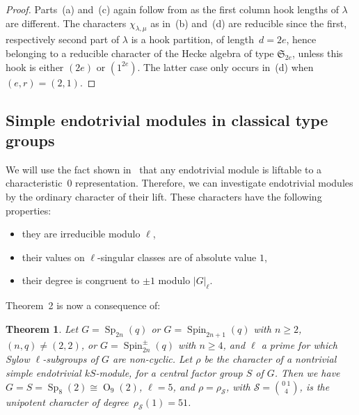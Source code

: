 \documentclass{ert-l}
\newcommand{\fS}{{\mathfrak{S}}}
\newcommand{\cS}{{\mathcal{S}}}
\newcommand{\Sp}{{\operatorname{Sp}}}
\newcommand{\Spin}{{\operatorname{Spin}}}
\newcommand{\OO}{{\operatorname{O}}}
\let\la=\lambda
\newtheorem{thm}{Theorem}[section]
\theoremstyle{definition}
\theoremstyle{remark}
\begin{document}
\begin{proof}
Parts~(a) and~(c) again follow from \cite[Thm.~4.10(i)]{JM00} as the first
column hook lengths of $\la$ are different. The characters
$\chi_{\la,\mu}$ as in~(b) and~(d) are reducible since the first, respectively
second part of $\la$ is a hook partition, of length~$d=2e$, hence belonging
to a reducible character of the Hecke algebra of type $\fS_{2e}$, unless this
hook is either $(2e)$ or $(1^{2e})$. The latter case only occurs in~(d) when
$(e,r)=(2,1)$.
\end{proof}

\subsection{Simple endotrivial modules in classical type groups}   \label{subsec:endoclass}

We will use the fact shown
in~\cite[Thm.~1.3]{LMS13} that any endotrivial module is liftable to a
characteristic~0 representation. Therefore, we can investigate endotrivial
modules by the ordinary character of their lift. These characters have the
following properties:
\begin{itemize}
 \item they are irreducible modulo $\ell$,
 \item their values on $\ell$-singular classes are of absolute value $1$,
 \item their degree is congruent to $\pm 1$ modulo $|G|_\ell$.
\end{itemize}
Theorem~2 is now a consequence of:

\begin{thm}   \label{thm:BC}
 Let $G=\Sp_{2n}(q)$ or $G=\Spin_{2n+1}(q)$ with $n\ge2$, $(n,q)\ne(2,2)$, or
 $G=\Spin_{2n}^\pm(q)$ with $n\ge4$, and $\ell$ a prime for which Sylow
 $\ell$-subgroups of $G$ are non-cyclic. Let $\rho$ be the character of a
 nontrivial simple endotrivial $kS$-module, for a central factor group $S$
 of $G$. Then we have $G=S=\Sp_8(2)\cong\OO_9(2)$, $\ell=5$, and
 $\rho=\rho_\cS$, with $\cS=\binom{0\ 1}{4}$, is the unipotent character of
 degree~$\rho_\cS(1)=51$.
\end{thm}
\end{document}
